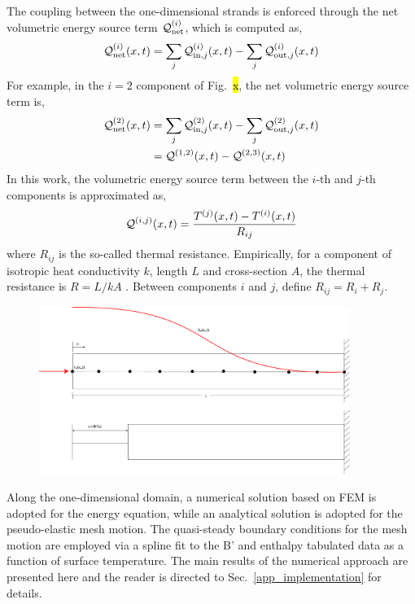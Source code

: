 The coupling between the one-dimensional strands is enforced through the net volumetric energy source term $\mathcal{Q}^{(i)}_{\text{net}}$, which is computed as,
\begin{equation}
    \mathcal{Q}^{(i)}_{\text{net}}(x,t) = \sum_j\mathcal{Q}^{(i)}_{\text{in},j}(x,t) - \sum_j\mathcal{Q}^{(i)}_{\text{out},j}(x,t)\label{eqn_net_volumetric_energy}
\end{equation}
For example, in the $i=2$ component of Fig.~\hl{x}, the net volumetric energy source term is,
\begin{subequations}
    \begin{align}
        \mathcal{Q}^{(2)}_{\text{net}}(x,t) &= \sum_j\mathcal{Q}^{(2)}_{\text{in},j}(x,t) - \sum_j\mathcal{Q}^{(2)}_{\text{out},j}(x,t)\notag\\
        &= \mathcal{Q}^{(1,2)}(x,t) - \mathcal{Q}^{(2,3)}(x,t)
    \end{align}
\end{subequations}
In this work, the volumetric energy source term between the $i$-th and $j$-th components is approximated as,
\begin{equation}
    \mathcal{Q}^{(i,j)}(x,t) = \frac{T^{(j)}(x,t) - T^{(i)}(x,t)}{R_{ij}}\label{eqn_volumetric_energy_approximation}
\end{equation}
where $R_{ij}$ is the so-called thermal resistance. Empirically, for a component of isotropic heat conductivity $k$, length $L$ and cross-section $A$, the thermal resistance is $R=L/kA$ . Between components $i$ and $j$, define $R_{ij} = R_i + R_j$.

\begin{figure}[h]
    \centering
    \includegraphics[width=0.9\textwidth]{./figs/ablation.png}
    \label{fig_ablation_domain}
\end{figure}

Along the one-dimensional domain, a numerical solution based on FEM is adopted for the energy equation, while an analytical solution is adopted for the pseudo-elastic mesh motion. The quasi-steady boundary conditions for the mesh motion are employed via a spline fit to the B' and enthalpy tabulated data as a function of surface temperature. The main results of the numerical approach are presented here and the reader is directed to Sec.~\ref{app_implementation} for details.

